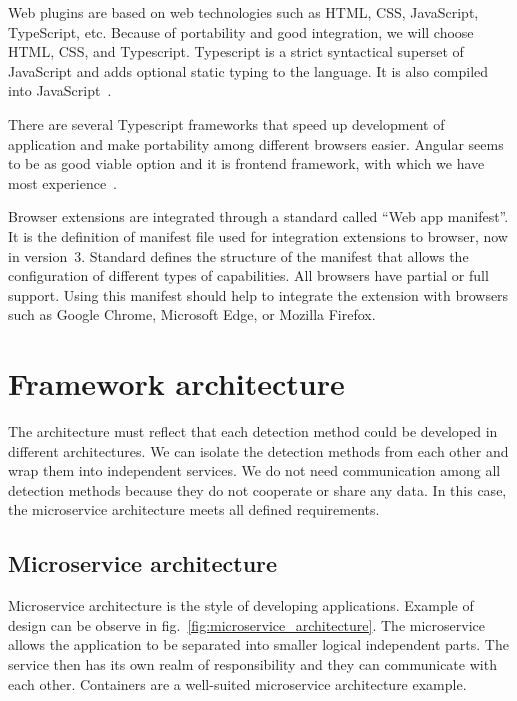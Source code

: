 Web plugins are based on web technologies such as HTML, CSS, JavaScript, TypeScript, etc. Because of portability and good integration, we will choose HTML, CSS, and Typescript. Typescript is a strict syntactical superset of JavaScript and adds optional static typing to the language. It is also compiled into JavaScript~\cite{Typescript}.

There are several Typescript frameworks that speed up development of application and make portability among different browsers easier. Angular seems to be as good viable option and it is frontend framework, with which we have most experience~\cite{Angular}.

Browser extensions are integrated through a standard called “Web app manifest”. It is the definition of manifest file used for integration extensions to browser, now in version~3. Standard defines the structure of the manifest that allows the configuration of different types of capabilities.  All browsers have partial or full support. Using this manifest should help to integrate the extension with browsers such as Google Chrome, Microsoft Edge, or Mozilla Firefox.~\cite{WebAppManifest}

\chapter{Framework architecture}

The architecture must reflect that each detection method could be developed in different architectures. We can isolate the detection methods from each other and wrap them into independent services. We do not need communication among all detection methods because they do not cooperate or share any data. In this case, the microservice architecture meets all defined requirements.

\section{Microservice architecture}

Microservice architecture is the style of developing applications. Example of design can be observe in fig.~\ref{fig:microservice_architecture}. The microservice allows the application to be separated into smaller logical independent parts. The service then has its own realm of responsibility and they can communicate with each other. Containers are a well-suited microservice architecture example.~\cite{WhatIsMicroservicesArchitecture}

